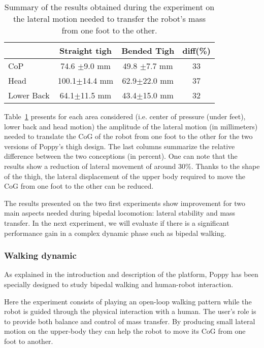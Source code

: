 \begin{table}[ht]
\centering
\begin{tabular}{|l|c|c|c|}
  \hline &      Straight tigh &                     Bended Tigh &                   diff(\%) \\
  \hline CoP & 74.6 {\scriptsize$\pm$9.0} mm &     49.8 {\scriptsize$\pm$7.7} mm & 33\\
  Head & 100.1{\scriptsize$\pm$14.4} mm&     62.9{\scriptsize$\pm$22.0} mm &  37\\
  Lower Back & 64.1{\scriptsize$\pm$11.5} mm&      43.4{\scriptsize$\pm$15.0} mm &  32 \\
  \hline
\end{tabular}
\caption{Summary of the results obtained during the experiment on the lateral motion needed to transfer the robot’s mass from one foot to the other.}
\label{tab:CoG_motion}
\end{table}

Table~\ref{tab:CoG_motion} presents for each area considered (i.e. center of pressure (under feet), lower back and head motion) the amplitude of the lateral motion (in millimeters) needed to translate the CoG of the robot from one foot to the other for the two versions of Poppy’s thigh design. The last columns summarize the relative difference between the two conceptions (in percent). One can note that the results show a reduction of lateral movement of around 30\%. Thanks to the shape of the thigh, the lateral displacement of the upper body required to move the CoG from one foot to the other can be reduced.


The results presented on the two first experiments show improvement for two main aspects needed during bipedal locomotion: lateral stability and mass transfer. In the next experiment, we will evaluate if there is a significant performance gain in a complex dynamic phase such as bipedal walking.


\subsubsection{Walking dynamic} %
\label{sub:walking_dynamic}

As explained in the introduction and description of the platform, Poppy has been specially designed to study bipedal walking and human-robot interaction.

Here the experiment consists of playing an open-loop walking pattern while the robot is guided through the physical interaction with a human. The user’s role is to provide both balance and control of mass transfer. By producing small lateral motion on the upper-body they can help the robot to move its CoG from one foot to another.

